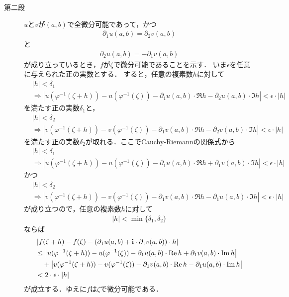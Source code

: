 \begin{sketch}
\begin{description}
			\item[第二段]
				$u$と$v$が$(a,b)$で全微分可能であって，かつ
				\begin{align}
					\partial_1 u(a,b) = \partial_2 v(a,b)
				\end{align}
				と
				\begin{align}
					\partial_2 u(a,b) = -\partial_1 v(a,b)
				\end{align}
				が成り立っているとき，$f$が$\zeta$で微分可能であることを示す．
				いま$\epsilon$を任意に与えられた正の実数とする．
				すると，任意の複素数$h$に対して
				\begin{align}
					&|h| < \delta_1  \\
					&\Longrightarrow
					\left|u(\varphi^{-1}(\zeta+h)) - u(\varphi^{-1}(\zeta)) 
					- \partial_1 u(a,b) \cdot \Re{h} - \partial_2 u(a,b) \cdot \Im{h}\right| < \epsilon \cdot |h|
				\end{align}
				を満たす正の実数$\delta_1$と，
				\begin{align}
					&|h| < \delta_2 \\
					&\Longrightarrow
					\left|v(\varphi^{-1}(\zeta+h)) - v(\varphi^{-1}(\zeta)) 
					- \partial_1 v(a,b) \cdot \Re{h} - \partial_2 v(a,b) \cdot \Im{h}\right| < \epsilon \cdot |h|
				\end{align}
				を満たす正の実数$\delta_2$が取れる．ここでCauchy-Riemannの関係式から
				\begin{align}
					&|h| < \delta_1 \\
					&\Longrightarrow
					\left|u(\varphi^{-1}(\zeta+h)) - u(\varphi^{-1}(\zeta)) 
					- \partial_1 u(a,b) \cdot \Re{h} + \partial_1 v(a,b) \cdot \Im{h}\right| < \epsilon \cdot |h|
				\end{align}
				かつ
				\begin{align}
					&|h| < \delta_2 \\
					&\Longrightarrow
					\left|v(\varphi^{-1}(\zeta+h)) - v(\varphi^{-1}(\zeta)) 
					- \partial_1 v(a,b) \cdot \Re{h} - \partial_1 u(a,b) \cdot \Im{h}\right| < \epsilon \cdot |h|
				\end{align}
				が成り立つので，任意の複素数$h$に対して
				\begin{align}
					|h| < \min{\{\delta_1,\delta_2\}}
				\end{align}
				ならば
				\begin{align}
					&\left|f(\zeta+h) - f(\zeta) - (\partial_1 u(a,b) + \mathbf{i} \cdot \partial_1 v(a,b)) \cdot h\right| \\
					&\leq \left|u(\varphi^{-1}(\zeta+h)) - u(\varphi^{-1}(\zeta)) 
					- \partial_1 u(a,b) \cdot \operatorname{Re} h + \partial_1 v(a,b) \cdot \operatorname{Im} h\right| \\
					&\quad + \left|v(\varphi^{-1}(\zeta+h)) - v(\varphi^{-1}(\zeta)) 
					- \partial_1 v(a,b) \cdot \operatorname{Re} h - \partial_1 u(a,b) \cdot \operatorname{Im} h\right| \\
					&< 2 \cdot \epsilon \cdot |h|
				\end{align}
				が成立する．ゆえに$f$は$\zeta$で微分可能である．
				\QED
		\end{description}
	\end{sketch}
	
